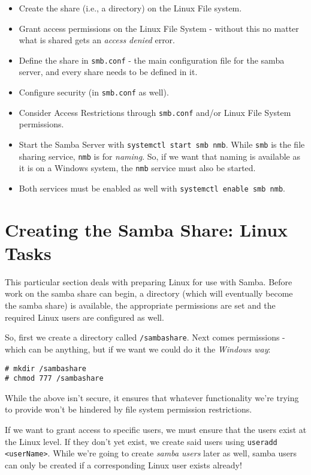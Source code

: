 \begin{itemize}
	\item Create the share (i.e., a directory) on the Linux File system. 
	\item Grant access permissions on the Linux File System - without this no matter what is shared gets an \textit{access denied} error. 
	\item Define the share in \verb|smb.conf| - the main configuration file for the samba server, and every share needs to be defined in it.
	\item Configure security (in \verb|smb.conf| as well).
	\item Consider Access Restrictions through \verb|smb.conf| and/or Linux File System permissions.
	\item Start the Samba Server with \verb|systemctl start smb nmb|. While \verb|smb| is the file sharing service, \verb|nmb| is for \textit{naming}. So, if we want that naming is available as it is on a Windows system, the \verb|nmb| service must also be started. 
	\item Both services must be enabled as well with \verb|systemctl enable smb nmb|.
\end{itemize}

\section{Creating the Samba Share: Linux Tasks}
This particular section deals with preparing Linux for use with Samba. Before work on the samba share can begin, a directory (which will eventually become the samba share) is available, the appropriate permissions are set and the required Linux users are configured as well. 

So, first we create a directory called \verb|/sambashare|. Next comes permissions - which can be anything, but if we want we could do it the \textit{Windows way}:

\vspace{-15pt}
\begin{verbatim}
# mkdir /sambashare
# chmod 777 /sambashare
\end{verbatim}
\vspace{-10pt}	

\noindent
While the above isn't secure, it ensures that whatever functionality we're trying to provide won't be hindered by file system permission restrictions. 

If we want to grant access to specific users, we must ensure that the users exist at the Linux level. If they don't yet exist, we create said users using \verb|useradd <userName>|. While we're going to create \textit{samba users} later as well, samba users can only be created if a corresponding Linux user exists already!

